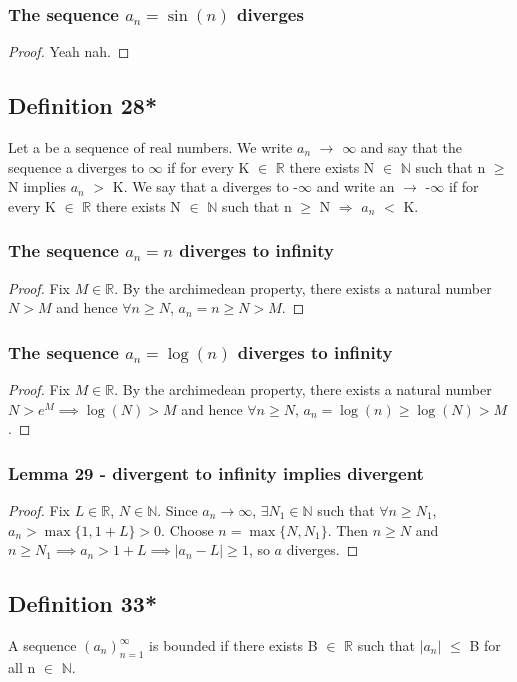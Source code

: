 \documentclass{article}
\begin{document}
\subsubsection{The sequence $a_n = \sin(n)$ diverges}
\begin{proof}
Yeah nah.
\end{proof}
\subsection{Definition 28*}
Let a be a sequence of real numbers. We write $a_n$ $ \to  $ $\infty$ and say that
the sequence a diverges to $\infty$ if for every K $\in$ $\mathbb{R}$ there exists N $\in$ $\mathbb{N}$ such that n $\geq$ N
implies $a_n$ $>$ K. We say that a diverges to -$\infty$ and write an $ \to  $ -$\infty$
if for every K $\in$ $\mathbb{R}$
there exists N $\in$ $\mathbb{N}$ such that n $\geq$ N $\Longrightarrow$ $a_n$ $<$ K.
\subsubsection{The sequence $a_n = n$ diverges to infinity}
\begin{proof}
Fix $M \in \mathbb{R}$. By the archimedean property, there exists a natural number $N>M$
and hence $\forall n \geq N$, $a_n = n \geq N >M$.
\end{proof}
\subsubsection{The sequence $a_n = \log(n)$ diverges to infinity}
\begin{proof}
Fix $M \in \mathbb{R}$. By the archimedean property, there exists
a natural number $N>e^M \implies \log(N)>M$
and hence $\forall n \geq N$, $a_n = \log(n) \geq \log(N) >M$.
\end{proof}
\subsubsection{Lemma 29 - divergent to infinity implies divergent}
\begin{proof}
Fix $L \in \mathbb{R}$, $N \in \mathbb{N}$. Since $a_n \to \infty$, $\exists N_1 \in \mathbb{N}$
such that $\forall n \geq N_1$, $a_n>\max \{ 1, 1+L \}>0$. Choose $n = \max \{N,N_1 \}$.
Then $n \geq N$ and $n \geq N_1 \implies a_n>1+L \implies |a_n-L| \geq 1$, so $a$ diverges.
\end{proof}
\subsection{Definition 33*}
A sequence $(a_n)^{\infty}_{n=1}$ is bounded if there exists B $\in$ $\mathbb{R}$ such that $|a_n |$ $\leq$ B
for all n $\in$ $\mathbb{N}$.
\end{document}
